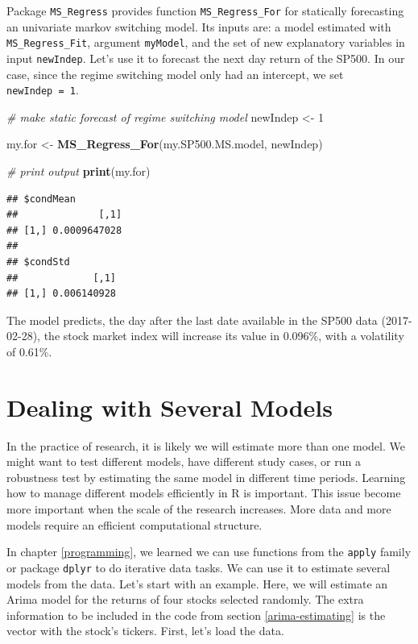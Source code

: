 \documentclass[11pt,]{book}
\newenvironment{Shaded}{\begin{snugshade}}{\end{snugshade}}
\newcommand{\KeywordTok}[1]{\textcolor[rgb]{0.27,0.27,0.27}{\textbf{#1}}}
\newcommand{\DecValTok}[1]{\textcolor[rgb]{0.06,0.06,0.06}{#1}}
\newcommand{\StringTok}[1]{\textcolor[rgb]{0.5,0.5,0.5}{#1}}
\newcommand{\CommentTok}[1]{\textcolor[rgb]{0.56,0.35,0.01}{\textit{#1}}}
\newcommand{\NormalTok}[1]{#1}
\begin{document}
Package \texttt{MS\_Regress} provides function \texttt{MS\_Regress\_For}
for statically forecasting an univariate markov switching model. Its
inputs are: a model estimated with \texttt{MS\_Regress\_Fit}, argument
\texttt{myModel}, and the set of new explanatory variables in input
\texttt{newIndep}. Let's use it to forecast the next day return of the
SP500. In our case, since the regime switching model only had an
intercept, we set \texttt{newIndep\ =\ 1}.

\begin{Shaded}
\begin{Highlighting}[]
\CommentTok{# make static forecast of regime switching model}
\NormalTok{newIndep <-}\StringTok{ }\DecValTok{1}

\NormalTok{my.for <-}\StringTok{ }\KeywordTok{MS_Regress_For}\NormalTok{(my.SP500.MS.model, newIndep)}

\CommentTok{# print output}
\KeywordTok{print}\NormalTok{(my.for)}
\end{Highlighting}
\end{Shaded}

\begin{verbatim}
## $condMean
##              [,1]
## [1,] 0.0009647028
## 
## $condStd
##             [,1]
## [1,] 0.006140928
\end{verbatim}

The model predicts, the day after the last date available in the SP500
data (2017-02-28), the stock market index will increase its value in
0.096\%, with a volatility of 0.61\%.

\section{Dealing with Several Models}\label{dealing-with-several-models}

In the practice of research, it is likely we will estimate more than one
model. We might want to test different models, have different study
cases, or run a robustness test by estimating the same model in
different time periods. Learning how to manage different models
efficiently in R is important. This issue become more important when the
scale of the research increases. More data and more models require an
efficient computational structure.

In chapter \ref{programming}, we learned we can use functions from the
\texttt{apply} family or package \texttt{dplyr} to do iterative data
tasks. We can use it to estimate several models from the data. Let's
start with an example. Here, we will estimate an Arima model for the
returns of four stocks selected randomly. The extra information to be
included in the code from section \ref{arima-estimating} is the vector
with the stock's tickers. First, let's load the data.
\end{document}
